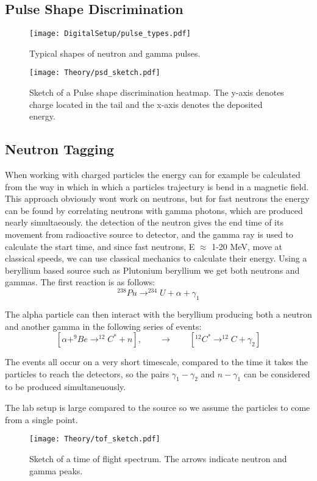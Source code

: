 \documentclass[main.tex]{subfiles}
\begin{document}
\subsection{Pulse Shape Discrimination}
\begin{figure}[ht]
	\centering
    	\texttt{[image: DigitalSetup/pulse\_types.pdf]}
        \caption{Typical shapes of neutron and gamma pulses.}
	    \label{fig:pulse_types} 
\end{figure}
\begin{figure}[ht]
    \centering
        \texttt{[image: Theory/psd\_sketch.pdf]}
        \caption{Sketch of a Pulse shape discrimination heatmap. The y-axis denotes charge located in the tail and the x-axis denotes the deposited energy.}
    \label{fig:psd_sketch} 
\end{figure}

\subsection{Neutron Tagging}
When working with charged particles the energy can for example be calculated from the way in which in which a particles trajectury is bend in a magnetic field. This approach obviously wont work on neutrons, but for fast neutrons the energy can be found by correlating neutrons with gamma photons, which are produced nearly simultaeously. the detection of the neutron gives the end time of its movement from radioactive source to detector, and the gamma ray is used to calculate the start time, and since fast neutrons, E $\approx$ 1-20 MeV, move at classical speeds, we can use classical mechanics to calculate their energy. 
Using a beryllium based source such as Plutonium beryllium we get both neutrons and gammas. The first reaction is as follows: $$^{238}Pu\rightarrow^{234}U+\alpha+\gamma_1$$

The alpha particle can then interact with the beryllium producing both a neutron and another gamma in the following series of events: $$[\alpha+^{9}Be\rightarrow^{12}C^{*}+n],\qquad \longrightarrow \qquad [^{12}C^ {*}\rightarrow^{12}C+\gamma_2]$$

The events all occur on a very short timescale, compared to the time it takes the particles to reach the detectors, so the pairs $\gamma_1-\gamma_2$ and $n-\gamma_1$ can be considered to be produced simultaneuously. %

The lab setup is large compared to the source so we assume the particles to come from a single point.
\begin{figure}[ht]
    \centering
        \texttt{[image: Theory/tof\_sketch.pdf]}
        \caption{Sketch of a time of flight spectrum. The arrows indicate neutron and gamma peaks.}
    \label{fig:tof_sketch} 
\end{figure}
\end{document}
